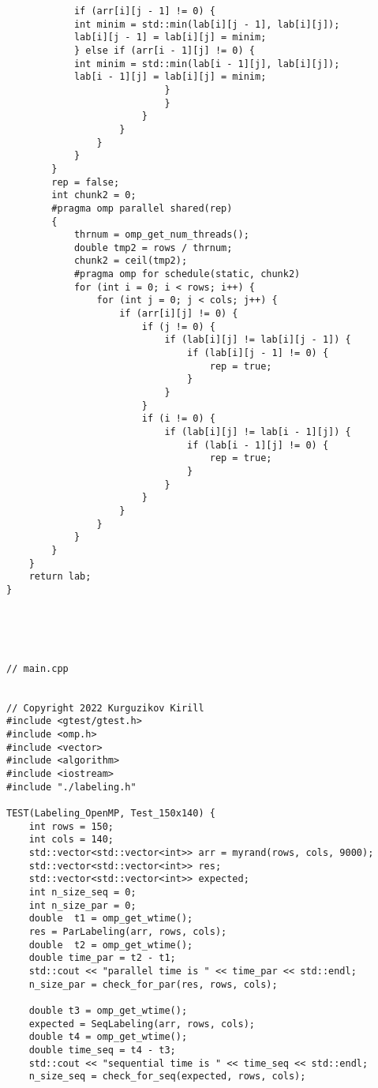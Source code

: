 \documentclass{report}
\begin{document}
\begin{lstlisting}
            if (arr[i][j - 1] != 0) {
            int minim = std::min(lab[i][j - 1], lab[i][j]);
            lab[i][j - 1] = lab[i][j] = minim;
            } else if (arr[i - 1][j] != 0) {
            int minim = std::min(lab[i - 1][j], lab[i][j]);
            lab[i - 1][j] = lab[i][j] = minim;
                            }
                            }
                        }
                    }
                }
            }
        }
        rep = false;
        int chunk2 = 0;
        #pragma omp parallel shared(rep)
        {
            thrnum = omp_get_num_threads();
            double tmp2 = rows / thrnum;
            chunk2 = ceil(tmp2);
            #pragma omp for schedule(static, chunk2)
            for (int i = 0; i < rows; i++) {
                for (int j = 0; j < cols; j++) {
                    if (arr[i][j] != 0) {
                        if (j != 0) {
                            if (lab[i][j] != lab[i][j - 1]) {
                                if (lab[i][j - 1] != 0) {
                                    rep = true;
                                }
                            }
                        }
                        if (i != 0) {
                            if (lab[i][j] != lab[i - 1][j]) {
                                if (lab[i - 1][j] != 0) {
                                    rep = true;
                                }
                            }
                        }
                    }
                }
            }
        }
    }
    return lab;
}





// main.cpp


// Copyright 2022 Kurguzikov Kirill
#include <gtest/gtest.h>
#include <omp.h>
#include <vector>
#include <algorithm>
#include <iostream>
#include "./labeling.h"

TEST(Labeling_OpenMP, Test_150x140) {
    int rows = 150;
    int cols = 140;
    std::vector<std::vector<int>> arr = myrand(rows, cols, 9000);
    std::vector<std::vector<int>> res;
    std::vector<std::vector<int>> expected;
    int n_size_seq = 0;
    int n_size_par = 0;
    double  t1 = omp_get_wtime();
    res = ParLabeling(arr, rows, cols);
    double  t2 = omp_get_wtime();
    double time_par = t2 - t1;
    std::cout << "parallel time is " << time_par << std::endl;
    n_size_par = check_for_par(res, rows, cols);

    double t3 = omp_get_wtime();
    expected = SeqLabeling(arr, rows, cols);
    double t4 = omp_get_wtime();
    double time_seq = t4 - t3;
    std::cout << "sequential time is " << time_seq << std::endl;
    n_size_seq = check_for_seq(expected, rows, cols);


\end{lstlisting}
\end{document}
